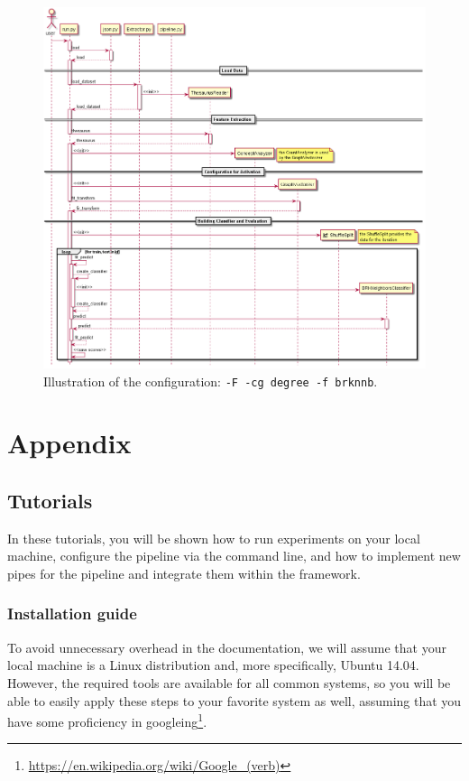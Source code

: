 \documentclass{article}
\begin{document}
\begin{figure}[hbt!]
    \centering
    \includegraphics[width=\textwidth]{graphics/sequence_DEGREE_BRKNNB.png}
    \caption{
      Illustration of the configuration: \texttt{-F -cg degree -f brknnb}.
    }
    \label{fig:example}
\end{figure}

\section{Appendix}
\subsection{Tutorials}
In these tutorials, you will be shown how to run experiments on your local machine, configure the pipeline via the command line, and how to implement new
pipes for the pipeline and integrate them within the framework.
\subsubsection{Installation guide}
To avoid unnecessary overhead in the documentation, we will assume that your local machine is a Linux distribution and, more specifically, Ubuntu 14.04.
However, the required tools are available for all common systems, so you will be able to easily apply these steps to your favorite system as well,
assuming that you have some proficiency in googleing\footnote{\url{https://en.wikipedia.org/wiki/Google_(verb)}}.
\end{document}
